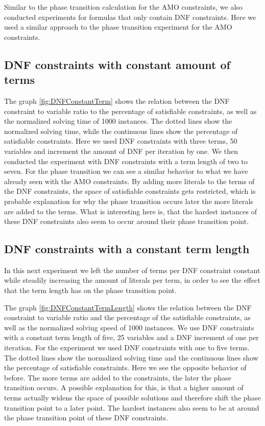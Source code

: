 Similar to the phase transition calculation for the AMO constraints, we also conducted experiments for formulas that only contain DNF constraints. Here we used a similar approach to the phase transition experiment for the AMO constraints.

\subsection{DNF constraints with constant amount of terms}




The graph \ref{fig:DNFConstantTerm} shows the relation between the DNF constraint to variable ratio to the percentage of satisfiable constraints, as well as the normalized solving time of 1000 instances. The dotted lines show the normalized solving time, while the continuous lines show the percentage of satisfiable constraints. Here we used DNF constraints with three terms, 50 variables and increment the amount of DNF per iteration by one. We then conducted the experiment with DNF constraints with a term length of two to seven. For the phase transition we can see a similar behavior to what we have already seen with the AMO constraints. By adding more literals to the terms of the DNF constraints, the space of satisfiable constraints gets restricted, which is probable explanation for why the phase transition occurs later the more literals are added to the terms. What is interesting here is, that the hardest instances of these DNF constraints also seem to occur around their phase transition point.

\subsection{DNF constraints with a constant term length}

In this next experiment we left the number of terms per DNF constraint constant while steadily increasing the amount of literals per term, in order to see the effect that the term length has on the phase transition point.

	

The graph \ref{fig:DNFConstantTermLength} shows the relation between the DNF constraint to variable ratio and the percentage of the satisfiable constraints, as well as the normalized solving speed of 1000 instances. We use DNF constraints with a constant term length of five, 25 variables and a DNF increment of one per iteration. For the experiment we used DNF constraints with one to five terms. The dotted lines show the normalized solving time and the continuous lines show the percentage of satisfiable constraints. Here we see the opposite behavior of before. The more terms are added to the constraints, the later the phase transition occurs. A possible explanation for this, is that a higher amount of terms actually widens the space of possible solutions and therefore shift the phase transition point to a later point. The hardest instances also seem to be at around the phase transition point of these DNF constraints.

